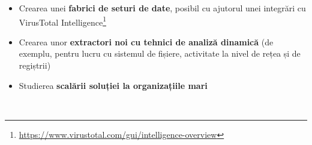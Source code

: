 \documentclass[../../main.tex]{subfiles}
\begin{document}
\begin{itemize}
    \item Crearea unei \textbf{fabrici de seturi de date}, posibil cu ajutorul unei integrări cu VirusTotal Intelligence\footnote{\href{https://www.virustotal.com/gui/intelligence-overview}{https://www.virustotal.com/gui/intelligence-overview}}
    \item Crearea unor \textbf{extractori noi cu tehnici de analiză dinamică} (de e\-xemplu, pentru lucru cu sistemul de fișiere, activitate la nivel de rețea și de regiștrii)
    \item Studierea \textbf{scalării soluției la organizațiile mari}
\end{itemize}

\newpage \
\end{document}
